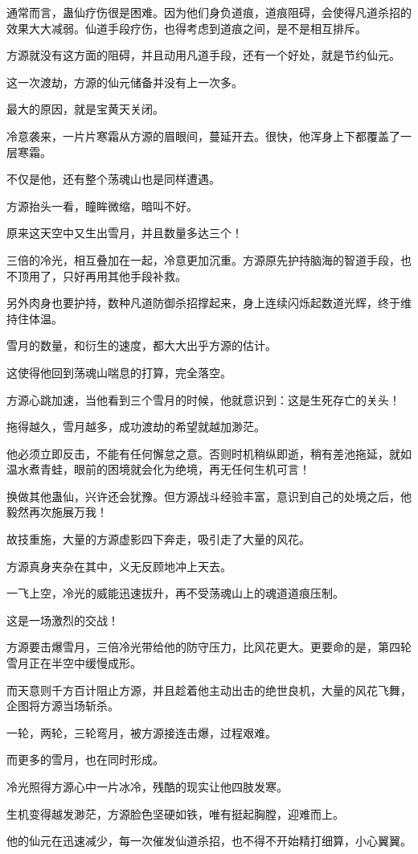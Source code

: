 \begin{this_body}
通常而言，蛊仙疗伤很是困难。因为他们身负道痕，道痕阻碍，会使得凡道杀招的效果大大减弱。仙道手段疗伤，也得考虑到道痕之间，是不是相互排斥。

方源就没有这方面的阻碍，并且动用凡道手段，还有一个好处，就是节约仙元。

这一次渡劫，方源的仙元储备并没有上一次多。

最大的原因，就是宝黄天关闭。

冷意袭来，一片片寒霜从方源的眉眼间，蔓延开去。很快，他浑身上下都覆盖了一层寒霜。

不仅是他，还有整个荡魂山也是同样遭遇。

方源抬头一看，瞳眸微缩，暗叫不好。

原来这天空中又生出雪月，并且数量多达三个！

三倍的冷光，相互叠加在一起，冷意更加沉重。方源原先护持脑海的智道手段，也不顶用了，只好再用其他手段补救。

另外肉身也要护持，数种凡道防御杀招撑起来，身上连续闪烁起数道光辉，终于维持住体温。

雪月的数量，和衍生的速度，都大大出乎方源的估计。

这使得他回到荡魂山喘息的打算，完全落空。

方源心跳加速，当他看到三个雪月的时候，他就意识到：这是生死存亡的关头！

拖得越久，雪月越多，成功渡劫的希望就越加渺茫。

他必须立即反击，不能有任何懈怠之意。否则时机稍纵即逝，稍有差池拖延，就如温水煮青蛙，眼前的困境就会化为绝境，再无任何生机可言！

换做其他蛊仙，兴许还会犹豫。但方源战斗经验丰富，意识到自己的处境之后，他毅然再次施展万我！

故技重施，大量的方源虚影四下奔走，吸引走了大量的风花。

方源真身夹杂在其中，义无反顾地冲上天去。

一飞上空，冷光的威能迅速拔升，再不受荡魂山上的魂道道痕压制。

这是一场激烈的交战！

方源要击爆雪月，三倍冷光带给他的防守压力，比风花更大。更要命的是，第四轮雪月正在半空中缓慢成形。

而天意则千方百计阻止方源，并且趁着他主动出击的绝世良机，大量的风花飞舞，企图将方源当场斩杀。

一轮，两轮，三轮弯月，被方源接连击爆，过程艰难。

而更多的雪月，也在同时形成。

冷光照得方源心中一片冰冷，残酷的现实让他四肢发寒。

生机变得越发渺茫，方源脸色坚硬如铁，唯有挺起胸膛，迎难而上。

他的仙元在迅速减少，每一次催发仙道杀招，也不得不开始精打细算，小心翼翼。

\end{this_body}

